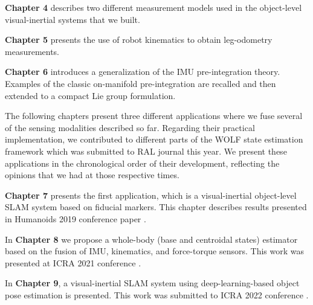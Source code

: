 \bigskip
\textbf{Chapter 4} describes two different measurement models used in the object-level visual-inertial systems that we built. 

\bigskip
\textbf{Chapter 5} presents the use of robot kinematics to obtain leg-odometry measurements. 

\bigskip
\textbf{Chapter 6} introduces a generalization of the IMU pre-integration theory. Examples of the classic on-manifold pre-integration are recalled and 
then extended to a compact Lie group formulation. 

\bigskip
The following chapters present three different applications where we fuse several of the sensing modalities described so far.
Regarding their practical implementation, we contributed to different parts of the WOLF state estimation framework \cite{sola2021wolf} which was 
submitted to RAL journal this year. We present these applications in the chronological order of their development, reflecting the opinions that
we had at those respective times.

\bigskip
\textbf{Chapter 7} presents the first application, which is a visual-inertial object-level SLAM system based on fiducial markers. This chapter describes
results presented in Humanoids 2019 conference paper \cite{fourmy2019absolute}.

\bigskip
In \textbf{Chapter 8} we propose a whole-body (base and centroidal states) estimator based on the fusion of IMU, kinematics, and force-torque sensors. This
work was presented at ICRA 2021 conference \cite{fourmy2021contact}.

\bigskip
In \textbf{Chapter 9}, a visual-inertial SLAM system using deep-learning-based object pose estimation is presented. This work was submitted to ICRA 2022 conference 
\cite{debeunne2021cosyslam}.






